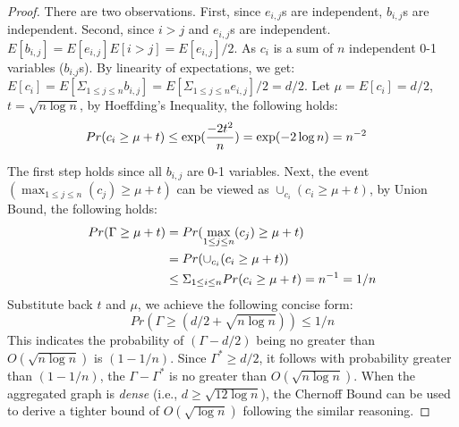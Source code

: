 \begin{proof}
There are two observations. First, since $e_{i,j}$s are independent,
$b_{i,j}$s are independent. Second, since $i>j$ and $e_{i,j}$s are independent. 
$E[b_{i,j}] = E[e_{i,j}]E[i>j]= E[e_{i,j}]/2$.
As $c_i$ is a sum of $n$ independent 0-1 variables ($b_{i.j}$s). By linearity 
of expectations,
we get: $E[c_i] = E[\Sigma_{1\leq j \leq n} b_{i,j}]=E[\Sigma_{1\leq j \leq n} e_{i,j}]/2 = d/2$.
 Let $\mu =E[c_i] = d/2$, 
$t = \sqrt{n\log n}$, by Hoeffding's Inequality, the following holds:
\vspace{-2mm}
\begin{equation*}
\vspace{-2mm}
\begin{split}
	Pr(c_i \geq \mu + t) &\leq \exp(\frac{-2t^2}{n}) = \exp(-2\log n) = n^{-2}
\end{split}
\end{equation*}

The first step holds since all $b_{i,j}$ are 0-1 variables. 
Next, the event $(\max_{1 \leq j \leq n}(c_j) \geq \mu + t)$ can be viewed as
$\cup_{c_i} (c_i \geq \mu + t )$, by Union Bound, the following holds:
\vspace{-2mm}
\begin{equation*}
\vspace{-2mm}
\begin{split}
	Pr(\Gamma \geq \mu + t) &=Pr(\max_{1\leq j \leq n}(c_j) \geq \mu + t)  \\
		& = Pr(\cup_{c_i} (c_i \geq \mu + t )) \\
		&\leq \Sigma_{1 \leq i \leq n} Pr(c_i \geq \mu + t) = n^{-1} = 1/n
\end{split}
\end{equation*}
Substitute back $t$ and $\mu$, we achieve the following concise form:
\vspace{-2mm}
\begin{equation*}
	Pr(\Gamma \geq (d/2 + \sqrt{n\log n})) \leq 1/n
\end{equation*}
This indicates the probability of $(\Gamma-d/2)$ being no greater than $ O(\sqrt{n\log n})$ is $(1-1/n)$. 
Since $\Gamma^* \geq d/2$, it follows with probability greater than $(1-1/n)$, 
the $\Gamma - \Gamma^*$ is no greater than $O(\sqrt{n\log n})$.
When the aggregated graph is \emph{dense} (i.e., $d\geq \sqrt{12 \log n}$),
the Chernoff Bound can be used to derive a tighter bound of 
$O(\sqrt{\log n}) $ following the similar reasoning.
\end{proof}


